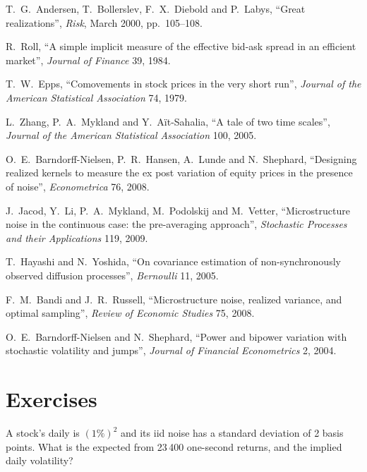 \begin{omsources}
\item T.~G.~Andersen, T.~Bollerslev, F.~X.~Diebold and P.~Labys, ``Great realizations'', \emph{Risk}, March 2000, pp.~105--108.
\item R.~Roll, ``A simple implicit measure of the effective bid-ask spread in an efficient market'', \emph{Journal of Finance} 39, 1984.
\item T.~W.~Epps, ``Comovements in stock prices in the very short run'', \emph{Journal of the American Statistical Association} 74, 1979.
\item L.~Zhang, P.~A.~Mykland and Y.~Aït-Sahalia, ``A tale of two time scales'', \emph{Journal of the American Statistical Association} 100, 2005.
\item O.~E.~Barndorff-Nielsen, P.~R.~Hansen, A.~Lunde and N.~Shephard, ``Designing realized kernels to measure the ex post variation of equity prices in the presence of
noise'', \emph{Econometrica} 76, 2008.
\item J.~Jacod, Y.~Li, P.~A.~Mykland, M.~Podolskij and M.~Vetter, ``Microstructure noise in the continuous case: the pre-averaging approach'', \emph{Stochastic Processes and
their Applications} 119, 2009.
\item T.~Hayashi and N.~Yoshida, ``On covariance estimation of non-synchronously observed diffusion processes'', \emph{Bernoulli} 11, 2005.
\item F.~M.~Bandi and J.~R.~Russell, ``Microstructure noise, realized variance, and optimal sampling'', \emph{Review of Economic Studies} 75, 2008.
\item O.~E.~Barndorff-Nielsen and N.~Shephard, ``Power and bipower variation with stochastic volatility and jumps'', \emph{Journal of Financial Econometrics} 2, 2004.
\end{omsources}

\section{Exercises}

\begin{exercise}[$\star$]\label{exo:qm:high-frequency-econometrics:1}
A stock's daily  is $(1\%)^2$ and its iid noise has a standard deviation of 2 basis points. What is the expected  from 23\,400 one-second
returns, and the implied daily volatility?
\end{exercise}

